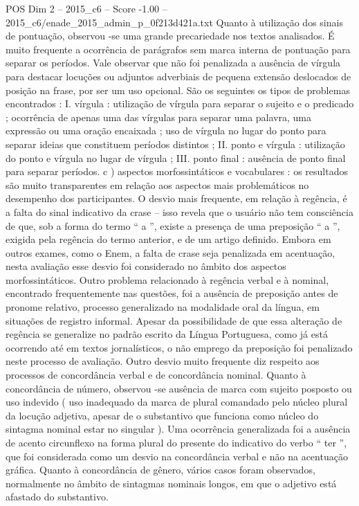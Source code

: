 \begin{textsample}{POS Dim 2 – 2015\_c6 – Score -1.00 – 2015\_c6/enade\_2015\_admin\_p\_0f213d421a.txt}
Quanto à utilização dos sinais de pontuação, observou -se uma grande precariedade nos textos analisados.
É muito frequente a ocorrência de parágrafos sem marca interna de pontuação para separar os períodos.
Vale observar que não foi penalizada a ausência de vírgula para destacar locuções ou adjuntos adverbiais de pequena extensão deslocados de posição na frase, por ser um uso opcional.
São os seguintes os tipos de problemas encontrados : I. vírgula : utilização de vírgula para separar o sujeito e o predicado ; ocorrência de apenas uma das vírgulas para separar uma palavra, uma expressão ou uma oração encaixada ; uso de vírgula no lugar do ponto para separar ideias que constituem períodos distintos ; II. ponto e vírgula : utilização do ponto e vírgula no lugar de vírgula ; III. ponto final : ausência de ponto final para separar períodos. c ) aspectos morfossintáticos e vocabulares : os resultados são muito transparentes em relação aos aspectos mais problemáticos no desempenho dos participantes.
O desvio mais frequente, em relação à regência, é a falta do sinal indicativo da crase – isso revela que o usuário não tem consciência de que, sob a forma do termo “ a ”, existe a presença de uma preposição “ a ”, exigida pela regência do termo anterior, e de um artigo definido.
Embora em outros exames, como o Enem, a falta de crase seja penalizada em acentuação, nesta avaliação esse desvio foi considerado no âmbito dos aspectos morfossintáticos.
Outro problema relacionado à regência verbal e à nominal, encontrado frequentemente nas questões, foi a ausência de preposição antes de pronome relativo, processo generalizado na modalidade oral da língua, em situações de registro informal.
Apesar da possibilidade de que essa alteração de regência se generalize no padrão escrito da Língua Portuguesa, como já está ocorrendo até em textos jornalísticos, o não emprego da preposição foi penalizado neste processo de avaliação.
Outro desvio muito frequente diz respeito aos processos de concordância verbal e de concordância nominal.
Quanto à concordância de número, observou -se ausência de marca com sujeito posposto ou uso indevido ( uso inadequado da marca de plural comandado pelo núcleo plural da locução adjetiva, apesar de o substantivo que funciona como núcleo do sintagma nominal estar no singular ).
Uma ocorrência generalizada foi a ausência de acento circunflexo na forma plural do presente do indicativo do verbo “ ter ”, que foi considerada como um desvio na concordância verbal e não na acentuação gráfica.
Quanto à concordância de gênero, vários casos foram observados, normalmente no âmbito de sintagmas nominais longos, em que o adjetivo está afastado do substantivo.

\end{textsample}
